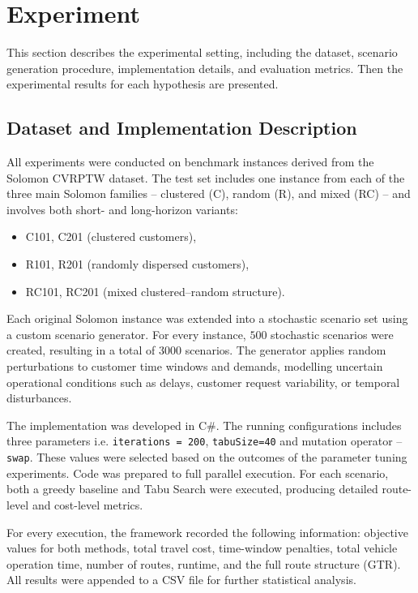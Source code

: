 \section{Experiment}
This section describes the experimental setting, including the dataset, scenario generation procedure, implementation details, and evaluation metrics. Then the experimental results for each hypothesis are presented.

\subsection{Dataset and Implementation Description}

All experiments were conducted on benchmark instances derived from the Solomon CVRPTW dataset. The test set includes one instance from each of the three main Solomon families -- clustered (C), random (R), and mixed (RC) -- and involves both short- and long-horizon variants:

\begin{itemize}
    \item C101, C201 (clustered customers),
    \item R101, R201 (randomly dispersed customers),
    \item RC101, RC201 (mixed clustered–random structure).
\end{itemize}

Each original Solomon instance was extended into a stochastic scenario set using a custom scenario generator. For every instance, $500$ stochastic scenarios were created, resulting in a total of $3000$ scenarios. The generator applies random perturbations to customer time windows and demands, modelling uncertain operational conditions such as delays, customer request variability, or temporal disturbances. 

The implementation was developed in C\#. The running configurations includes three parameters i.e.  \texttt{iterations = 200}, \texttt{tabuSize=40} and mutation operator -- \texttt{swap}. These values were selected based on the outcomes of the parameter tuning experiments. Code was prepared to full parallel execution. For each scenario, both a greedy baseline and Tabu Search were executed, producing detailed route-level and cost-level metrics.

For every execution, the framework recorded the following information: objective values for both methods, total travel cost, time-window penalties, total vehicle operation time, number of routes, runtime, and the full route structure (GTR). All results were appended to a CSV file for further statistical analysis.

